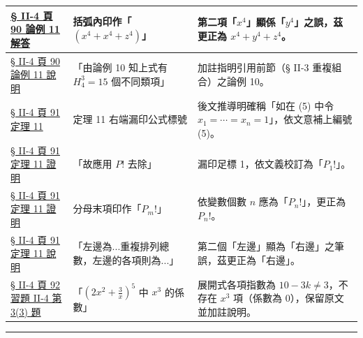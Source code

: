 \documentclass[a4paper,12pt,twoside]{article}
\begin{document}
\begin{xltabular}{\textwidth}{|p{3.2cm}|p{3.8cm}|X|}
\hyperref[note:b5s-ch2-p90-ex11-y4]{§ II-4 頁 90 論例 11 解答} & 
括弧內印作「$(x^4 + x^4 + z^4)$」 & 
第二項「$x^4$」顯係「$y^4$」之誤，茲更正為 $x^4 + y^4 + z^4$。 \\ \hline

\hyperref[note:b5s-ch2-p90-disc10]{§ II-4 頁 90 論例 11 說明} & 
「由論例 10 知上式有 $H_4^3 = 15$ 個不同類項」 & 
加註指明引用前節（§ II-3 重複組合）之論例 10。 \\ \hline

\hyperref[note:b5s-ch2-p91-eq5]{§ II-4 頁 91 定理 11} & 
定理 11 右端漏印公式標號 & 
後文推導明確稱「如在 (5) 中令 $x_1 = \cdots = x_n = 1$」，依文意補上編號 (5)。 \\ \hline

\hyperref[note:b5s-ch2-p91-p1]{§ II-4 頁 91 定理 11 證明} & 
「故應用 $P!$ 去除」 & 
漏印足標 1，依文義校訂為「$P_1!$」。 \\ \hline

\hyperref[note:b5s-ch2-p91-pm]{§ II-4 頁 91 定理 11 證明} & 
分母末項印作「$P_m!$」 & 
依變數個數 $n$ 應為「$P_n!$」，更正為 $P_n!$。 \\ \hline

\hyperref[note:b5s-ch2-p91-right]{§ II-4 頁 91 定理 11 說明} & 
「左邊為...重複排列總數，左邊的各項則為...」 & 
第二個「左邊」顯為「右邊」之筆誤，茲更正為「右邊」。 \\ \hline

\hyperref[note:b5s-ch2-p92-q3-3]{§ II-4 頁 92 習題 II-4 第 3(3) 題} & 
「$\left(2x^2 + \frac{3}{x}\right)^5$ 中 $x^3$ 的係數」 & 
展開式各項指數為 $10-3k \ne 3$，不存在 $x^3$ 項（係數為 0），保留原文並加註說明。 \\ \hline

\end{xltabular}

\vspace{1em}
\hrule
\vspace{1em}

\tableofcontents
\newpage


\end{document}
